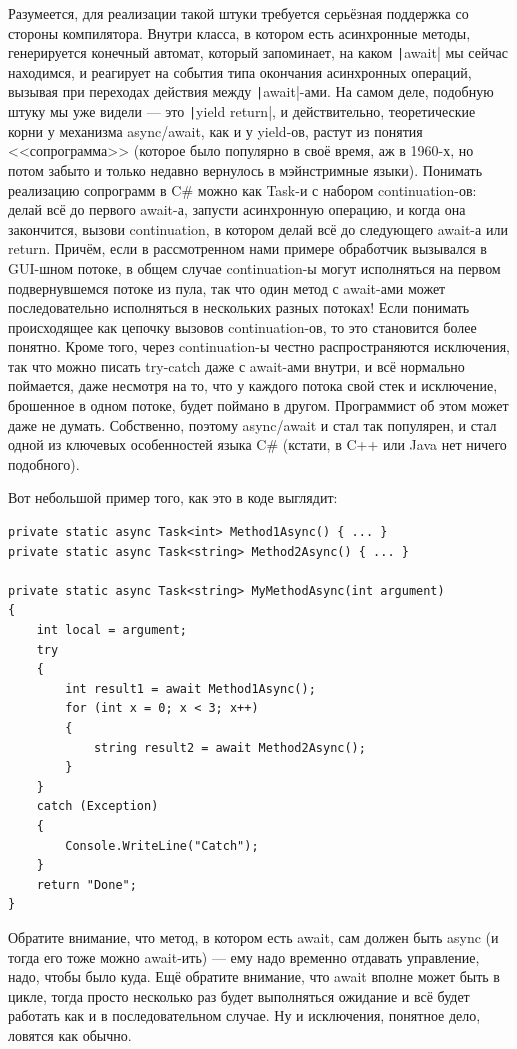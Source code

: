 \documentclass{../../text-style}
\begin{document}
Разумеется, для реализации такой штуки требуется серьёзная поддержка со стороны компилятора. Внутри класса, в котором есть асинхронные методы, генерируется конечный автомат, который запоминает, на каком \texttt|await| мы сейчас находимся, и реагирует на события типа окончания асинхронных операций, вызывая при переходах действия между \texttt|await|-ами. На самом деле, подобную штуку мы уже видели --- это \texttt|yield return|, и действительно, теоретические корни у механизма async/await, как и у yield-ов, растут из понятия <<сопрограмма>> (которое было популярно в своё время, аж в 1960-х, но потом забыто и только недавно вернулось в мэйнстримные языки). Понимать реализацию сопрограмм в C\# можно как Task-и с набором continuation-ов: делай всё до первого await-а, запусти асинхронную операцию, и когда она закончится, вызови continuation, в котором делай всё до следующего await-а или return. Причём, если в рассмотренном нами примере обработчик вызывался в GUI-шном потоке, в общем случае continuation-ы могут исполняться на первом подвернувшемся потоке из пула, так что один метод с await-ами может последовательно исполняться в нескольких разных потоках! Если понимать происходящее как цепочку вызовов continuation-ов, то это становится более понятно. Кроме того, через continuation-ы честно распространяются исключения, так что можно писать try-catch даже с await-ами внутри, и всё нормально поймается, даже несмотря на то, что у каждого потока свой стек и исключение, брошенное в одном потоке, будет поймано в другом. Программист об этом может даже не думать. Собственно, поэтому async/await и стал так популярен, и стал одной из ключевых особенностей языка C\# (кстати, в C++ или Java нет ничего подобного).

Вот небольшой пример того, как это в коде выглядит:

\begin{verbatim}
private static async Task<int> Method1Async() { ... }
private static async Task<string> Method2Async() { ... }

private static async Task<string> MyMethodAsync(int argument) 
{
    int local = argument;
    try 
    {
        int result1 = await Method1Async();
        for (int x = 0; x < 3; x++) 
        {
            string result2 = await Method2Async();
        }
    }
    catch (Exception) 
    { 
        Console.WriteLine("Catch"); 
    }
    return "Done";
}
\end{verbatim}

Обратите внимание, что метод, в котором есть await, сам должен быть async (и тогда его тоже можно await-ить) --- ему надо временно отдавать управление, надо, чтобы было куда. Ещё обратите внимание, что await вполне может быть в цикле, тогда просто несколько раз будет выполняться ожидание и всё будет работать как и в последовательном случае. Ну и исключения, понятное дело, ловятся как обычно.
\end{document}
